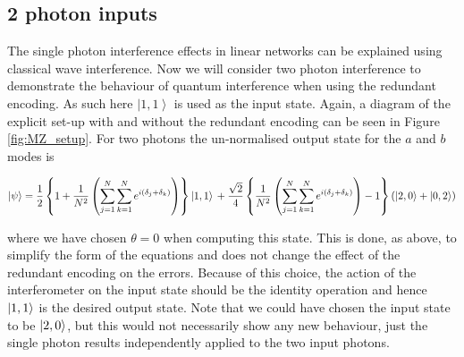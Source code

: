 \documentclass[aps,pra,twocolumn,superscriptaddress,numerical,floatfix]{revtex4-1}
\begin{document}
\subsection{2 photon inputs\label{2 photons N arbitrary}}

The single photon interference effects in linear networks can be explained using classical wave interference.  Now we will consider two photon interference to demonstrate the behaviour of quantum interference when using the redundant encoding. As such here $\left|1,1\right\rangle$ is used as the input state. Again, a diagram of the explicit set-up with and without the redundant encoding can be seen in Figure \ref{fig:MZ_setup}. For two photons the un-normalised output state for the $a$ and $b$ modes is
\begin{widetext}
\begin{equation}
	\ket{\psi} =  \frac{1}{2}\left\{ 1+\frac{1}{N^{2}}\left(\sum_{j=1}^{N}\sum_{k=1}^{N}e^{i(\delta_{j}+\delta_{k})}\right)\right\} \ket{1,1} \\
	+\frac{\sqrt{2}}{4}\left\{ \frac{1}{N^{2}}\left(\sum_{j=1}^{N}\sum_{k=1}^{N}e^{i(\delta_{j}+\delta_{k})}\right)-1\right\} \left(\ket{2,0} +\ket{0,2}\right)\label{eq:2pNarbitrary S}
\end{equation}
\end{widetext}
where we have chosen $\theta=0$ when computing this state. This is done, as above, to simplify the form of the equations and does not change the effect of the redundant encoding on the errors.  Because of this choice, the action of the interferometer on the input state should be the identity operation and hence $\ket{1,1}$ is the desired output state.   Note that we could have chosen the input state to be $\ket{2,0}$, but this would not necessarily show any new behaviour, just the single photon results independently applied to the two input photons. 
\end{document}
